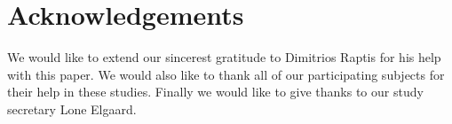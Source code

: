 \documentclass{sigchi}
\begin{document}
\section{Acknowledgements}
We would like to extend our sincerest gratitude to Dimitrios Raptis for his help with this paper. We would also like to thank all of our participating subjects for their help in these studies. Finally we would like to give thanks to our study secretary Lone Elgaard.
%
%
%
%
%
\balance{}



\end{document}
